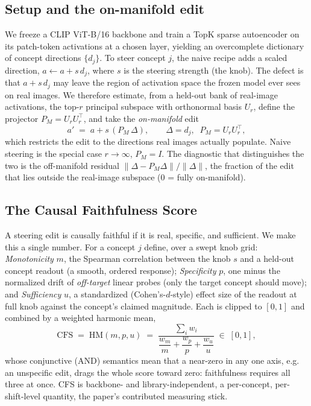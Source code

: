 \documentclass[conference]{IEEEtran}
\begin{document}
\subsection{Setup and the on-manifold edit}
We freeze a CLIP ViT-B/16 backbone and train a TopK sparse autoencoder on its patch-token activations at a chosen layer, yielding an overcomplete dictionary of concept directions $\{d_j\}$. To steer concept $j$, the naive recipe adds a scaled direction, $a \leftarrow a + s\,d_j$, where $s$ is the steering strength (the knob). The defect is that $a + s\,d_j$ may leave the region of activation space the frozen model ever sees on real images. We therefore estimate, from a held-out bank of real-image activations, the top-$r$ principal subspace with orthonormal basis $U_r$, define the projector $P_M = U_r U_r^{\top}$, and take the \emph{on-manifold} edit
\begin{equation}
a' \;=\; a + s\,(P_M\,\Delta), \qquad \Delta = d_j,\;\; P_M = U_r U_r^{\top},
\label{eq:onmanifold}
\end{equation}
which restricts the edit to the directions real images actually populate. Naive steering is the special case $r\!\rightarrow\!\infty$, $P_M = I$. The diagnostic that distinguishes the two is the off-manifold residual $\lVert \Delta - P_M\Delta\rVert / \lVert\Delta\rVert$, the fraction of the edit that lies outside the real-image subspace (0 = fully on-manifold).

\subsection{The Causal Faithfulness Score}
A steering edit is causally faithful if it is real, specific, and sufficient. We make this a single number. For a concept $j$ define, over a swept knob grid:
\emph{Monotonicity} $m$, the Spearman correlation between the knob $s$ and a held-out concept readout (a smooth, ordered response);
\emph{Specificity} $p$, one minus the normalized drift of \emph{off-target} linear probes (only the target concept should move);
and \emph{Sufficiency} $u$, a standardized (Cohen's-$d$-style) effect size of the readout at full knob against the concept's claimed magnitude. Each is clipped to $[0,1]$ and combined by a weighted harmonic mean,
\begin{equation}
\mathrm{CFS} \;=\; \mathrm{HM}(m, p, u) \;=\; \frac{\sum_i w_i}{\dfrac{w_m}{m} + \dfrac{w_p}{p} + \dfrac{w_u}{u}} \;\in\; [0,1],
\label{eq:cfs}
\end{equation}
whose conjunctive (AND) semantics mean that a near-zero in any one axis, e.g. an unspecific edit, drags the whole score toward zero: faithfulness requires all three at once. CFS is backbone- and library-independent, a per-concept, per-shift-level quantity, the paper's contributed measuring stick.
\end{document}
